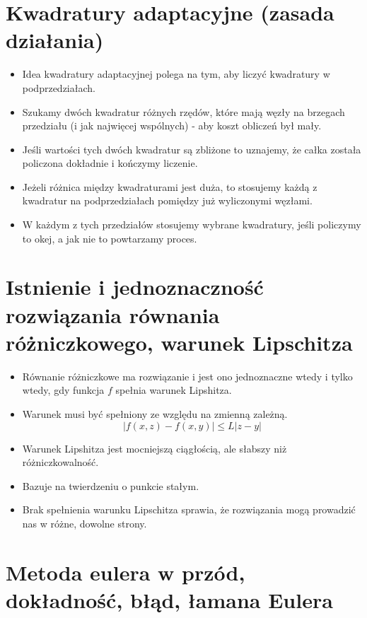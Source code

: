 \documentclass[a4paper]{article}
\begin{document}
\section{Kwadratury adaptacyjne (zasada działania)}
\begin{itemize}
    \item Idea kwadratury adaptacyjnej polega na tym, aby liczyć kwadratury w podprzedziałach.
    \item Szukamy dwóch kwadratur różnych rzędów, które mają węzły na brzegach przedziału (i jak najwięcej wspólnych) - aby koszt obliczeń był mały.
    \item Jeśli wartości tych dwóch kwadratur są zbliżone to uznajemy, że całka została policzona dokładnie i kończymy liczenie.
    \item Jeżeli różnica między kwadraturami jest duża, to stosujemy każdą z kwadratur na podprzedziałach pomiędzy już wyliczonymi węzłami.
    \item W każdym z tych przedziałów stosujemy wybrane kwadratury, jeśli policzymy to okej, a jak nie to powtarzamy proces.
\end{itemize}

\section{Istnienie i jednoznaczność rozwiązania równania różniczkowego, warunek Lipschitza}
\begin{itemize}
    \item Równanie różniczkowe ma rozwiązanie i jest ono jednoznaczne wtedy i tylko wtedy, gdy funkcja $f$ spełnia warunek Lipshitza.
    \item Warunek musi być spełniony ze względu na zmienną zależną.
    \begin{equation*}
        |f(x,z)-f(x,y)| \leq L|z-y|
    \end{equation*}
    \item Warunek Lipshitza jest mocniejszą ciągłością, ale słabszy niż różniczkowalność.
    \item Bazuje na twierdzeniu o punkcie stałym.
    \item Brak spełnienia warunku Lipschitza sprawia, że rozwiązania mogą prowadzić nas w różne, dowolne strony.
\end{itemize}

\section{Metoda eulera w przód, dokładność, błąd, łamana Eulera}
\end{document}
